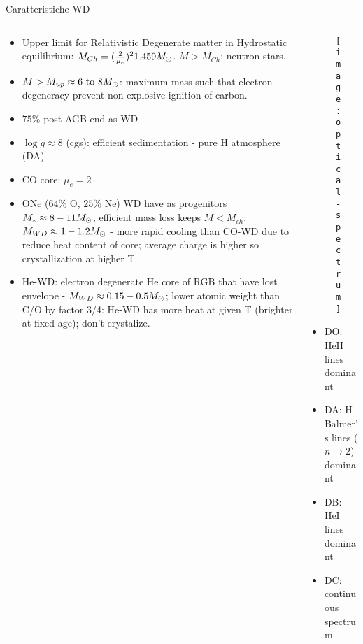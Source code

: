 \begin{frame}{Caratteristiche WD}
    \begin{columns}[T]
        \begin{column}{0.6\textwidth}
            \begin{itemize}
                \item Upper limit for Relativistic Degenerate matter in Hydrostatic equilibrium: $M_{Ch}=(\frac{2}{\mu_e})^2\num{1.459}M_{\odot}{}$. $M>M_{Ch}$: neutron stars.
                \item $M>M_{up}\approx\numrange{6}{8}\msun{}$: maximum mass such that electron degeneracy prevent non-explosive ignition of carbon.
                \item $75\%$ post-AGB end as WD
                \item $\log{g}\approx 8$ (cgs): efficient sedimentation - pure H atmosphere (DA)
                \item CO core: $\mu_e=2$
                \item ONe ($64\%$ O, $25\%$ Ne) WD have as progenitors $M_*\approx 8-11M_{\odot}{}$, efficient mass loss keeps $M<M_{ch}$: $M_{WD}\approx 1-1.2M_{\odot}{}$ - more rapid cooling than CO-WD due to reduce heat content of core; average charge is higher so crystallization at higher T.
                \item He-WD: electron degenerate He core of RGB that have lost envelope - $M_{WD}\approx0.15-0.5M_{\odot}{}$; lower atomic weight than C/O by factor 3/4: He-WD has more heat at given T (brighter at fixed age); don't crystalize.
            \end{itemize}
        \end{column}
        \begin{column}{0.4\textwidth}
\begin{figure}[!ht]
\texttt{[image: optical-spectrum]}\label{fig:optical-spectrum}
\end{figure}
\begin{itemize}
    \item DO: HeII lines dominant
    \item DA: H Balmer's lines ($n\to2$) dominant
    \item DB: HeI lines dominant
    \item DC: continuous spectrum
\end{itemize}
            
        \end{column}
    \end{columns}
    
\end{frame}


